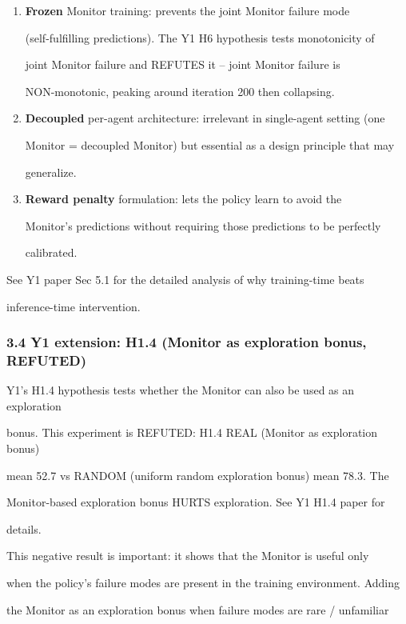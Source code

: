 \documentclass[11pt]{article}
\begin{document}
\begin{enumerate}
\def\labelenumi{\arabic{enumi}.}
\item
  \textbf{Frozen} Monitor training: prevents the joint Monitor failure
  mode

  (self-fulfilling predictions). The Y1 H6 hypothesis tests monotonicity
  of

  joint Monitor failure and REFUTES it -- joint Monitor failure is

  NON-monotonic, peaking around iteration 200 then collapsing.
\item
  \textbf{Decoupled} per-agent architecture: irrelevant in single-agent
  setting (one

  Monitor = decoupled Monitor) but essential as a design principle that
  may

  generalize.
\item
  \textbf{Reward penalty} formulation: lets the policy learn to avoid
  the

  Monitor's predictions without requiring those predictions to be
  perfectly

  calibrated.
\end{enumerate}

See Y1 paper Sec 5.1 for the detailed analysis of why training-time
beats

inference-time intervention.

\subsubsection{3.4 Y1 extension: H1.4 (Monitor as exploration bonus,
REFUTED)}\label{y1-extension-h1.4-monitor-as-exploration-bonus-refuted}

Y1's H1.4 hypothesis tests whether the Monitor can also be used as an
exploration

bonus. This experiment is REFUTED: H1.4 REAL (Monitor as exploration
bonus)

mean 52.7 vs RANDOM (uniform random exploration bonus) mean 78.3. The

Monitor-based exploration bonus HURTS exploration. See Y1 H1.4 paper for

details.

This negative result is important: it shows that the Monitor is useful
only

when the policy's failure modes are present in the training environment.
Adding

the Monitor as an exploration bonus when failure modes are rare /
unfamiliar
\end{document}
